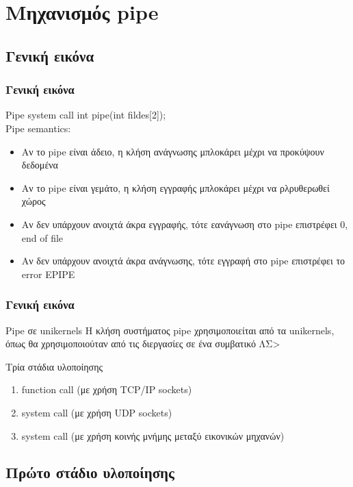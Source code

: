 \documentclass[red,slidestop,notes,compress,mathserif]{beamer}
\begin{document}
\section{Μηχανισμός pipe}
\subsection{Γενική εικόνα}

\begin{frame}
\frametitle{Γενική εικόνα}
\begin{block}{Pipe system call}
int pipe(int fildes[2]); \\
Pipe semantics:
\begin{itemize}
\item Αν το pipe είναι άδειο, η κλήση ανάγνωσης μπλοκάρει μέχρι να προκύψουν δεδομένα
\item Αν το pipe είναι γεμάτο, η κλήση εγγραφής μπλοκάρει μέχρι να ρλρυθερωθεί χώρος
\item Αν δεν υπάρχουν ανοιχτά άκρα εγγραφής, τότε εανάγνωση στο pipe επιστρέφει 0, end of file
\item Αν δεν υπάρχουν ανοιχτά άκρα ανάγνωσης, τότε εγγραφή στο pipe επιστρέφει το error EPIPE
\end{itemize}
\end{block}
\end{frame}

\begin{frame}
\frametitle{Γενική εικόνα}
\begin{block}{Pipe σε unikernels}
Η κλήση συστήματος pipe χρησιμοποιείται από τα unikernels, όπως θα χρησιμοποιούταν από τις διεργασίες σε ένα συμβατικό ΛΣ>
\end{block}
\begin{block}{Τρία στάδια υλοποίησης}
\begin{enumerate}
\item function call (με χρήση TCP/IP sockets)
\item system call (με χρήση UDP sockets)
\item system call (με χρήση κοινής μνήμης μεταξύ εικονικών μηχανών)
\end{enumerate}
\end{block}
\end{frame}

\subsection{Πρώτο στάδιο υλοποίησης}
\end{document}
